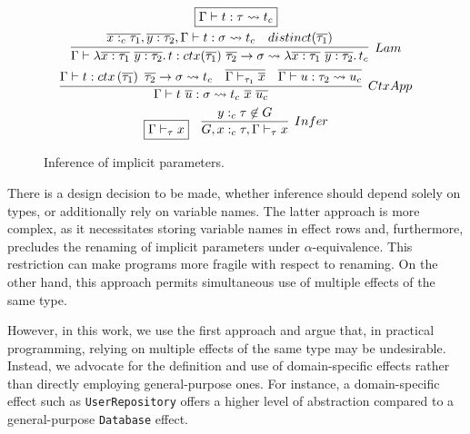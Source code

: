 \documentclass[acmsmall,review,screen]{acmart}
\newcommand{\mathframebox}[1]{\framebox{$\displaystyle #1$}}
\newcommand{\ap}{~}
\newcommand{\ctx}[1]{ctx\left(#1\right)~}
\newcommand{\step}{\rightsquigarrow}
\begin{document}
\begin{figure}
    \begin{gather*}
        \mathframebox{\Gamma\vdash t : \tau \step t_{c}} \\
        \infer[Lam]{
            \Gamma\vdash \lambda \overline{x : \tau_1} ~ \overline{y : \tau_2} \ldotp t : ctx(\overline{\tau_1}) ~ \overline{\tau_2} \to \sigma \step \lambda \overline{x : \tau_1} ~ \overline{y : \tau_2} \ldotp t_c
        }{
            \overline{x :_c \tau_1}, \overline{y : \tau_2}, \Gamma\vdash t : \sigma \step t_c &
            distinct(\overline{\tau_1})
        } \\
        \infer[CtxApp]{
            \Gamma\vdash t\ap\overline{u} : \sigma \step t_{c} \ap \overline{x}\ap\overline{u_{c}}
        }{
            \Gamma\vdash t : \ctx{\overline{\tau_1}} \overline{\tau_2} \to \sigma \step t_{c} &
            \overline{\Gamma\vdash_{\tau_1}\overline{x}} &
            \overline{\Gamma\vdash u : \tau_2 \step u_{c}}
        } \\
        \begin{array}{cc}
            \mathframebox{\Gamma\vdash_\tau x} &
            \infer[Infer]{
                G, x :_c \tau, \Gamma\vdash_{\tau} x
            }{
                y :_c \tau \not\in G
            }
        \end{array}
    \end{gather*}
    \caption{Inference of implicit parameters.}
    \label{fig:core-im-core-implicit-inference}
\end{figure}

There is a design decision to be made, whether inference should depend solely on types, or additionally rely on variable names.
The latter approach is more complex, as it necessitates storing variable names in effect rows and, furthermore, precludes the renaming of implicit parameters under $\alpha$-equivalence.
This restriction can make programs more fragile with respect to renaming.
On the other hand, this approach permits simultaneous use of multiple effects of the same type.

However, in this work, we use the first approach and argue that, in practical programming, relying on multiple effects of the same type may be undesirable.
Instead, we advocate for the definition and use of domain-specific effects rather than directly employing general-purpose ones.
For instance, a domain-specific effect such as \lstinline[language=colang]{UserRepository} offers a higher level of abstraction compared to a general-purpose \lstinline[language=colang]{Database} effect.
\end{document}
